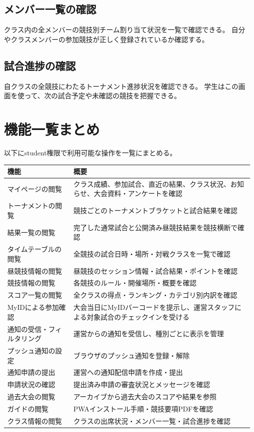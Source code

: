 \documentclass[12pt]{ltjsarticle}
\begin{document}
\subsection{メンバー一覧の確認}

クラス内の全メンバーの競技別チーム割り当て状況を一覧で確認できる。
自分やクラスメンバーの参加競技が正しく登録されているか確認する。

\subsection{試合進捗の確認}

自クラスの全競技にわたるトーナメント進捗状況を確認できる。
学生はこの画面を使って、次の試合予定や未確認の競技を把握できる。

\newpage

\section{機能一覧まとめ}

以下にstudent権限で利用可能な操作を一覧にまとめる。

\begin{longtable}{p{4.5cm}p{9cm}}
\toprule
\textbf{機能} & \textbf{概要} \\
\midrule
\endhead
マイページの閲覧 & クラス成績、参加試合、直近の結果、クラス状況、お知らせ、大会資料・アンケートを確認 \\
\midrule
トーナメントの閲覧 & 競技ごとのトーナメントブラケットと試合結果を確認 \\
\midrule
結果一覧の閲覧 & 完了した通常試合と公開済み昼競技結果を競技横断で確認 \\
\midrule
タイムテーブルの閲覧 & 全競技の試合日時・場所・対戦クラスを一覧で確認 \\
\midrule
昼競技情報の閲覧 & 昼競技のセッション情報・試合結果・ポイントを確認 \\
\midrule
競技情報の閲覧 & 各競技のルール・開催場所・概要を確認 \\
\midrule
スコア一覧の閲覧 & 全クラスの得点・ランキング・カテゴリ別内訳を確認 \\
\midrule
MyIDによる参加確認 & 大会当日にMyIDバーコードを提示し、運営スタッフによる対象試合のチェックインを受ける \\
\midrule
通知の受信・フィルタリング & 運営からの通知を受信し、種別ごとに表示を管理 \\
\midrule
プッシュ通知の設定 & ブラウザのプッシュ通知を登録・解除 \\
\midrule
通知申請の提出 & 運営への通知配信申請を作成・提出 \\
\midrule
申請状況の確認 & 提出済み申請の審査状況とメッセージを確認 \\
\midrule
過去大会の閲覧 & アーカイブから過去大会のスコアや結果を参照 \\
\midrule
ガイドの閲覧 & PWAインストール手順・競技要項PDFを確認 \\
\midrule
クラス情報の閲覧 & クラスの出席状況・メンバー一覧・試合進捗を確認 \\
\bottomrule
\end{longtable}
\end{document}
